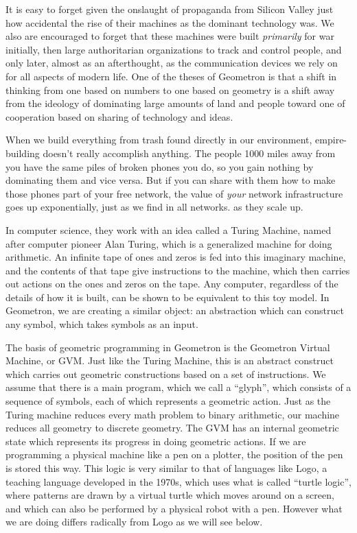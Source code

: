 It is easy to forget given the onslaught of propaganda from Silicon Valley just how accidental the rise of their machines as the dominant technology was.  We also are encouraged to forget that these machines were built \emph{primarily} for war initially, then large authoritarian organizations to track and control people, and only later, almost as an afterthought, as the communication devices we rely on for all aspects of modern life.  One of the theses of Geometron is that a shift in thinking from one based on numbers to one based on geometry is a shift away from the ideology of dominating large amounts of land and people toward one of cooperation based on sharing of technology and ideas.  

When we build everything from trash found directly in our environment, empire-building doesn't really accomplish anything.  The people 1000 miles away from you have the same piles of broken phones you do, so you gain nothing by dominating them and vice versa.  But if you can share with them how to make those phones part of your free network, the value of \emph{your} network infrastructure goes up exponentially, just as we find in all networks. as they scale up.  
  
In computer science, they work with an idea called a Turing Machine, named after computer pioneer Alan Turing, which is a generalized machine for doing arithmetic.  An infinite tape of ones and zeros is fed into this imaginary machine, and the contents of that tape give instructions to the machine, which then carries out actions on the ones and zeros on the tape.  Any computer, regardless of the details of how it is built, can be shown to be equivalent to this toy model.  In Geometron, we are creating a similar object: an abstraction which can construct any symbol, which takes symbols as an input.  

The basis of geometric programming in Geometron is the Geometron Virtual Machine, or GVM.  Just like the Turing Machine, this is an abstract construct which carries out geometric constructions based on a set of instructions.  We assume that there is a main program, which we call a ``glyph'', which consists of a sequence of symbols, each of which represents a geometric action.  Just as the Turing machine reduces every math problem to binary arithmetic, our machine reduces all geometry to discrete geometry.  The GVM has an internal geometric state which represents its progress in doing geometric actions.  If we are programming a physical machine like a pen on a plotter, the position of the pen is stored this way.  This logic is very similar to that of languages like Logo, a teaching language developed in the 1970s, which uses what is called ``turtle logic'', where patterns are drawn by a virtual turtle which moves around on a screen, and which can also be performed by a physical robot with a pen.  However what we are doing differs radically from Logo as we will see below.

